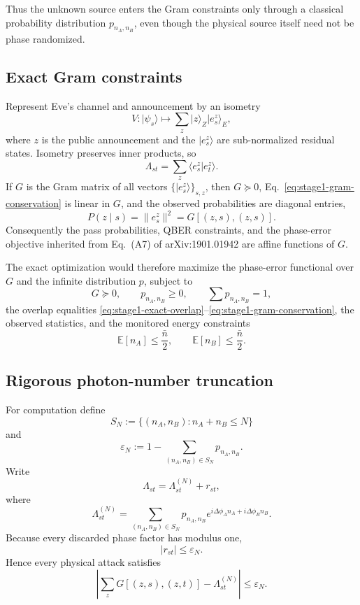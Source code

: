 \documentclass[11pt]{article}
\theoremstyle{remark}
\begin{document}
Thus the unknown source enters the Gram constraints only through a classical
probability distribution \(p_{n_A,n_B}\), even though the physical source
itself need not be phase randomized.

\subsection{Exact Gram constraints}

Represent Eve's channel and announcement by an isometry
\[
    V:\lvert\psi_s\rangle
    \longmapsto
    \sum_z \lvert z\rangle_Z\lvert e_s^z\rangle_E,
\]
where \(z\) is the public announcement and the
\(\lvert e_s^z\rangle\) are sub-normalized residual states. Isometry
preserves inner products, so
\begin{equation}
    \Lambda_{st}
    =
    \sum_z
      \langle e_s^z\vert e_t^z\rangle.
    \label{eq:stage1-gram-conservation}
\end{equation}
If \(G\) is the Gram matrix of all vectors
\(\{\lvert e_s^z\rangle\}_{s,z}\), then \(G\succeq0\),
Eq.~\eqref{eq:stage1-gram-conservation} is linear in \(G\), and the observed
probabilities are diagonal entries,
\[
    P(z\mid s)
    =
    \lVert e_s^z\rVert^2
    =
    G[(z,s),(z,s)].
\]
Consequently the pass probabilities, QBER constraints, and the phase-error
objective inherited from Eq.~(A7) of arXiv:1901.01942 are affine functions of
\(G\).

The exact optimization would therefore maximize the phase-error functional
over \(G\) and the infinite distribution \(p\), subject to
\[
    G\succeq0,
    \qquad
    p_{n_A,n_B}\ge0,
    \qquad
    \sum p_{n_A,n_B}=1,
\]
the overlap equalities
\eqref{eq:stage1-exact-overlap}--\eqref{eq:stage1-gram-conservation}, the
observed statistics, and the monitored energy constraints
\begin{equation}
    \mathbb E[n_A]\le\frac{\bar n}{2},
    \qquad
    \mathbb E[n_B]\le\frac{\bar n}{2}.
    \label{eq:stage1-energy-exact}
\end{equation}

\subsection{Rigorous photon-number truncation}

For computation define
\[
    S_N
    :=
    \{(n_A,n_B):n_A+n_B\le N\}
\]
and
\[
    \varepsilon_N
    :=
    1-\sum_{(n_A,n_B)\in S_N}p_{n_A,n_B}.
\]
Write
\[
    \Lambda_{st}
    =
    \Lambda^{(N)}_{st}+r_{st},
\]
where
\[
    \Lambda^{(N)}_{st}
    =
    \sum_{(n_A,n_B)\in S_N}
    p_{n_A,n_B}
    e^{i\Delta\phi_A n_A+i\Delta\phi_B n_B}.
\]
Because every discarded phase factor has modulus one,
\begin{equation}
    \lvert r_{st}\rvert
    \le
    \varepsilon_N.
    \label{eq:stage1-tail-overlap}
\end{equation}
Hence every physical attack satisfies
\begin{equation}
    \left|
      \sum_zG[(z,s),(z,t)]
      -
      \Lambda^{(N)}_{st}
    \right|
    \le
    \varepsilon_N.
    \label{eq:stage1-soc}
\end{equation}
\end{document}
